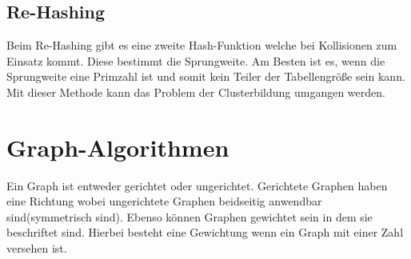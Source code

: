 \documentclass[12pt,a4paper]{article}
\begin{document}
\subsection{Re-Hashing}
Beim Re-Hashing gibt es eine zweite Hash-Funktion welche bei Kollisionen zum Einsatz kommt. Diese bestimmt die Sprungweite. Am Besten ist es, wenn die Sprungweite eine Primzahl ist und somit kein Teiler der Tabellengröße sein kann. Mit dieser Methode kann das Problem der Clusterbildung umgangen werden.

\section{Graph-Algorithmen}
Ein Graph ist entweder gerichtet oder ungerichtet. Gerichtete Graphen haben eine Richtung wobei ungerichtete Graphen beidseitig anwendbar sind(symmetrisch sind). Ebenso können Graphen gewichtet sein in dem sie beschriftet sind. Hierbei besteht eine Gewichtung wenn ein Graph mit einer Zahl versehen ist.
\end{document}
